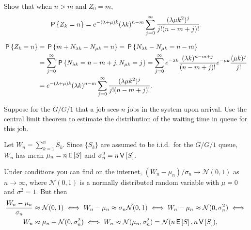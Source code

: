 \begin{exercise}\label{ex:l-134}
 Show
that when $n>m$ and $Z_0=m$, 
\begin{equation*}
 \P{Z_k=n}
= e^{-(\lambda+\mu)k} (\lambda k)^{n-m} \sum_{j=0}^\infty 
\frac{(\lambda\mu k^2)^j} {j!(n-m+j)!}.
\end{equation*}
\begin{solution}
\begin{align*}
 \P{Z_k=n}
&= \P{m+N_{\lambda k } - N_{\mu k} = n } 
= \P{N_{\lambda k}  - N_{\mu k}  = n - m } \\
&= \sum_{j=0}^\infty \P{N_{\lambda k}  =  n - m + j, N_{\mu k} =j}
= \sum_{j=0}^\infty e^{-\lambda k} \frac{(\lambda k )^{n - m + j}}{(n-m+j)!} e^{-\mu k} \frac{(\mu k )^j}{j!} \\
&= e^{-(\lambda+\mu)k} (\lambda k)^{n-m} \sum_{j=0}^\infty  \frac{(\lambda\mu k^2)^j} {j!(n-m+j)!}.
\end{align*}
\end{solution}
\end{exercise}




\begin{exercise}\label{ex:l-147}
 Suppose
 for the $G/G/1$ that a job sees $n$ jobs in the system upon arrival.
 Use the central limit theorem to estimate the distribution of the waiting time in queue for this job.
\begin{hint}
 Let $W_{n} = \sum_{k=1}^n S_k$.
 Since $\{S_k\}$ are assumed to be i.i.d.\ for the $G/G/1$ queue, $W_{n}$ has mean $\mu_n = n \E S$ and $\sigma_n^2 = n\V S$.
\end{hint}
\begin{solution} Under conditions you can find on the internet, $(W_{n} - \mu_n)/\sigma_n \to \mathcal{N}(0,1)$ as $n\to \infty$,
 where $\mathcal{N}(0,1)$ is a normally distributed random variable
 with $\mu=0$ and $\sigma^2=1$. But then 
 \begin{align*}
 \frac{\W_{n} - \mu_n}{\sigma_n} &\approx \mathcal{N}(0,1) \iff  W_{n} - \mu_n \approx \sigma_n \mathcal{N}(0,1) \iff
 W_{n} - \mu_n \approx \mathcal{N}(0,\sigma_n^2) \iff \\
 W_{n} &\approx \mu_n + \mathcal{N}(0,\sigma_n^2) \iff
 W_{n} \approx \mathcal{N}(\mu_n,\sigma_n^2) = \mathcal{N}(n\E S, n \V S),
 \end{align*}
\end{solution}
\end{exercise}




